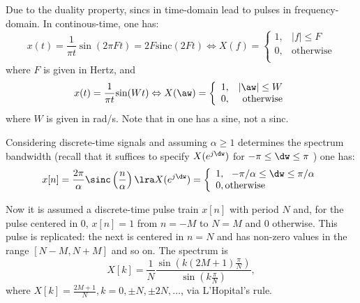 \begin{enumerate}
Due to the duality property, sincs in time-domain lead to pulses in frequency-domain. In continous-time, one has:
\begin{equation}
x(t) = \frac{1}{\pi t} \sin(2 \pi F t) = 2 F \textrm{sinc}(2Ft) \Leftrightarrow X(f)= \left\{\begin{array}{lr} 1,&|f| \le F \\ 0,& \textrm{otherwise} \\ \end{array} \right.
\label{eq:sinc_time_transform_Hz}
\end{equation}
where $F$ is given in Hertz, and
\begin{equation}
x(t) = \frac{1}{\pi t} \textrm{sin}(Wt) \Leftrightarrow  X(\aw)= \left\{\begin{array}{lr} 1,&|\aw| \le W \\ 0,& \textrm{otherwise} \\ \end{array} \right.
\label{eq:sinc_time_transform_Rad}
\end{equation}
where $W$ is given in rad/s. Note that in  one has a sine, not a sinc.

Considering discrete-time signals and assuming $\alpha \ge 1$ determines the spectrum bandwidth (recall that it suffices to specify $X(e^{j \dw})$ for $-\pi \le \dw \le \pi$ ) one has:
\begin{equation}
x[n] = \frac{2 \pi}{\alpha} \sinc \left( \frac{n}{\alpha}\right)  \lra X(e^{j \dw}) = \left\{ {\begin{array}{*{20}l} {1,~~-\pi/ \alpha \le \dw \le \pi/ \alpha} \\ {0,{\textrm{otherwise}}} \\ \end{array}  } \right.
\label{eq:sincTimeDomain}
\end{equation}

Now it is assumed a discrete-time pulse train $x[n]$ with period $N$ and, for the pulse centered in 0, $x[n]=1$ from $n=-M$ to $N=M$ and 0 otherwise. This pulse is replicated: the next is centered in $n=N$ and has non-zero values in the range $[N-M,N+M]$ and so on.
The spectrum is
\[
X[k]= \frac{1}{N} \frac{\sin \left(k (2M+1) \frac{\pi}{N} \right)}{\sin \left(k \frac{\pi}{N} \right)},
\]
where $X[k]=\frac{2M+1}{N},k=0,\pm N, \pm 2N, \ldots$, via L'Hopital's rule.


\end{enumerate}
